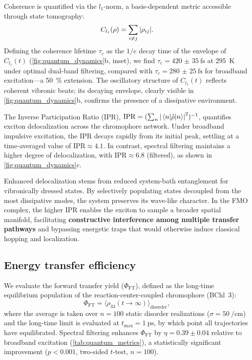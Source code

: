 \documentclass[journal=jpcl,manuscript=letter]{achemso}
\begin{document}
Coherence is quantified via the $l_1$-norm,\cite{Baumgratz2014} a basis-dependent metric accessible through state tomography:
\begin{equation}
C_{l_1}(\rho) = \sum_{i \neq j} \abs{\rho_{ij}}.
\label{eq:l1_coherence}
\end{equation}
Defining the coherence lifetime $\tau_c$ as the $1/e$ decay time of the envelope of $C_{l_1}(t)$ (\cref{fig:quantum_dynamics}b, inset), we find $\tau_c = \SI{420(35)}{\femto\second}$ at \SI{295}{\kelvin} under optimal dual-band filtering, compared with $\tau_c = \SI{280(25)}{\femto\second}$ for broadband excitation---a \SI{50}{\percent} extension. The oscillatory structure of $C_{l_1}(t)$ reflects coherent vibronic beats; its decaying envelope, clearly visible in \cref{fig:quantum_dynamics}b, confirms the presence of a dissipative environment.

The Inverse Participation Ratio (IPR), $\mathrm{IPR} = (\sum_n \abs{\mel{n}{\hat{\rho}}{n}}^2)^{-1}$, quantifies exciton delocalization across the chromophore network. Under broadband impulsive excitation, the IPR decays rapidly from its initial peak, settling at a time-averaged value of $\mathrm{IPR} \approx \num{4.1}$. In contrast, spectral filtering maintains a higher degree of delocalization, with $\mathrm{IPR} \approx \num{6.8}$ (filtered), as shown in \cref{fig:quantum_dynamics}c. 

Enhanced delocalization stems from reduced system-bath entanglement for vibronically dressed states. By selectively populating states decoupled from the most dissipative modes, the system preserves its wave-like character. In the FMO complex, the higher IPR enables the exciton to sample a broader spatial manifold, facilitating \textbf{constructive interference among multiple transfer pathways} and bypassing energetic traps that would otherwise induce classical hopping and localization.

\subsection*{Energy transfer efficiency}

We evaluate the forward transfer yield ($\Phi_{\mathrm{FT}}$), defined as the long-time equilibrium population of the reaction-center-coupled chromophore (BChl~3):
\begin{equation}
\Phi_{\mathrm{FT}} = \bigl\langle \rho_{33}(t \to \infty) \bigr\rangle_{\mathrm{disorder}},
\label{eq:ETE}
\end{equation}
where the average is taken over $n=100$ static disorder realizations ($\sigma = \SI{50}{\per\centi\meter}$) and the long-time limit is evaluated at $t_{\max} = \SI{1}{\pico\second}$, by which point all trajectories have equilibrated. Spectral filtering enhances $\Phi_{\mathrm{FT}}$ by $\eta = 0.39 \pm 0.04$ relative to broadband excitation (\cref{tab:quantum_metrics}), a statistically significant improvement ($p < 0.001$, two-sided $t$-test, $n=100$).
\end{document}
